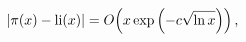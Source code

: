 \[\left|\mathop{\pi\/}\nolimits\!\left(x\right)-\mathop{\mathrm{li}\/}\nolimits%
\!\left(x\right)\right|=\mathop{O\/}\nolimits\!\left(x\mathop{\exp\/}\nolimits%
\left(-c\sqrt{\mathop{\ln\/}\nolimits x}\right)\right),\]